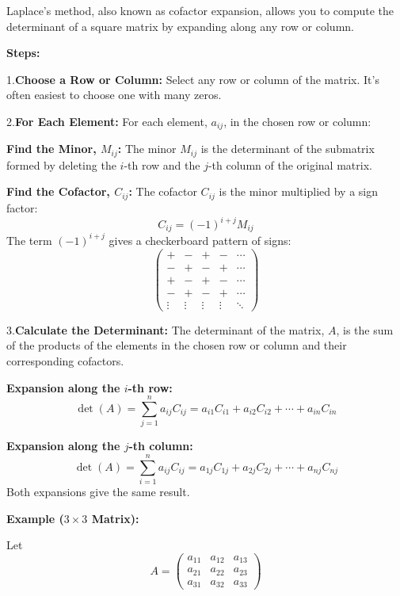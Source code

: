 Laplace's method, also known as cofactor expansion, allows you to compute the determinant of a square matrix by expanding along any row or column.

\textbf{Steps:}

1.\textbf{Choose a Row or Column:} Select any row or column of the matrix.  It's often easiest to choose one with many zeros.

 2.\textbf{For Each Element:} For each element, \(a_{ij}\), in the chosen row or column:

    \textbf{Find the Minor, \(M_{ij}\):} The minor \(M_{ij}\) is the determinant of the submatrix formed by deleting the 
    \indent \(i\)-th row and the \(j\)-th column of the original matrix.

    \textbf{Find the Cofactor, \(C_{ij}\):} The cofactor \(C_{ij}\) is the minor multiplied by a sign factor:
        \[
        C_{ij} = (-1)^{i+j} M_{ij}
        \]
        The term  \((-1)^{i+j}\)  gives a checkerboard pattern of signs:
        \[
        \begin{pmatrix}
        + & - & + & - & \cdots \\
        - & + & - & + & \cdots \\
        + & - & + & - & \cdots \\
        - & + & - & + & \cdots \\
        \vdots & \vdots & \vdots & \vdots & \ddots
        \end{pmatrix}
        \]

 3.\textbf{Calculate the Determinant:} The determinant of the matrix, \(A\), is the sum of the products of the elements in the chosen row or column and their corresponding cofactors.

    \textbf{Expansion along the \(i\)-th row:}
        \[
        \det(A) = \sum_{j=1}^{n} a_{ij} C_{ij} = a_{i1}C_{i1} + a_{i2}C_{i2} + \cdots + a_{in}C_{in}
        \]

    \textbf{Expansion along the \(j\)-th column:}
        \[
        \det(A) = \sum_{i=1}^{n} a_{ij} C_{ij} = a_{1j}C_{1j} + a_{2j}C_{2j} + \cdots + a_{nj}C_{nj}
        \]
        Both expansions give the same result.

\textbf{Example (\(3\times3\) Matrix):}

Let
\[
A = \begin{pmatrix}
a_{11} & a_{12} & a_{13} \\
a_{21} & a_{22} & a_{23} \\
a_{31} & a_{32} & a_{33}
\end{pmatrix}
\]

